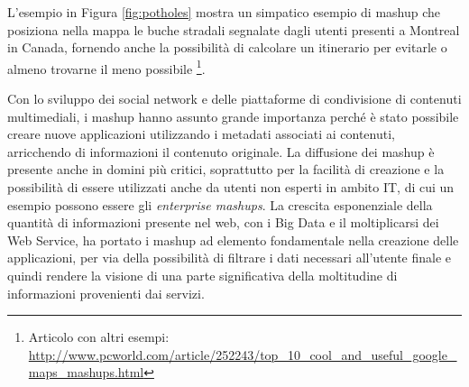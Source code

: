 L'esempio in Figura \ref{fig:potholes} mostra un simpatico esempio di mashup che posiziona nella mappa le buche stradali segnalate dagli utenti presenti a Montreal in Canada, fornendo anche la possibilità di calcolare un itinerario per evitarle o almeno trovarne il meno possibile \footnote{Articolo con altri esempi: \url{http://www.pcworld.com/article/252243/top_10_cool_and_useful_google_maps_mashups.html}}. 

Con lo sviluppo dei social network e delle piattaforme di condivisione di contenuti multimediali, i mashup hanno assunto grande importanza perché è stato possibile creare nuove applicazioni utilizzando i metadati associati ai contenuti, arricchendo di informazioni il contenuto originale.
La diffusione dei mashup è presente anche in domini più critici, soprattutto per la facilità di creazione e la possibilità di essere utilizzati anche da utenti non esperti in ambito IT, di cui un esempio possono essere gli \emph{enterprise mashups}.
La crescita esponenziale della quantità di informazioni presente nel web, con i Big Data e il moltiplicarsi dei Web Service, ha portato i mashup ad elemento fondamentale nella creazione delle applicazioni, per via della possibilità di filtrare i dati necessari all'utente finale e quindi rendere la visione di una parte significativa della moltitudine di informazioni provenienti dai servizi.


